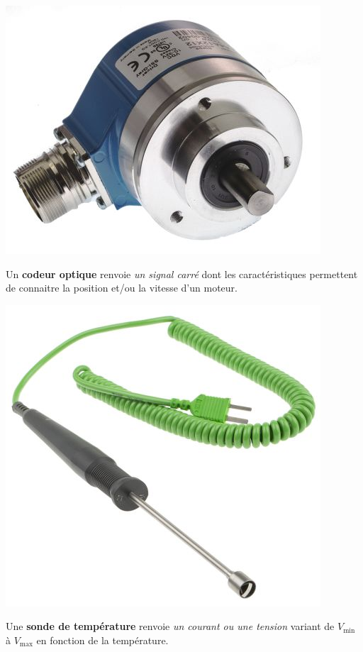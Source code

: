 \begin{UPSTIactivite}

		\begin{minipage}[b]{.9\textwidth}
		\begin{center}
			\includegraphics[width=.2\textwidth,height=.3\textheight,keepaspectratio]{images/codeur_optique}
		\end{center}

			Un \textbf{codeur optique} renvoie \textit{un signal carré} dont les caractéristiques permettent de connaitre la position et/ou la vitesse d'un moteur.
		\end{minipage}



			\begin{minipage}[b]{.9\textwidth}
			\begin{center}
				\includegraphics[width=.2\textwidth,height=.3\textheight,keepaspectratio]{images/sondeTemperature}
			\end{center}

				Une \textbf{sonde de température} renvoie \textit{un courant ou une tension} variant de $V_{\text{min}}$ à  $V_{\text{max}}$ en fonction de la température.
			\end{minipage}
\end{UPSTIactivite}
